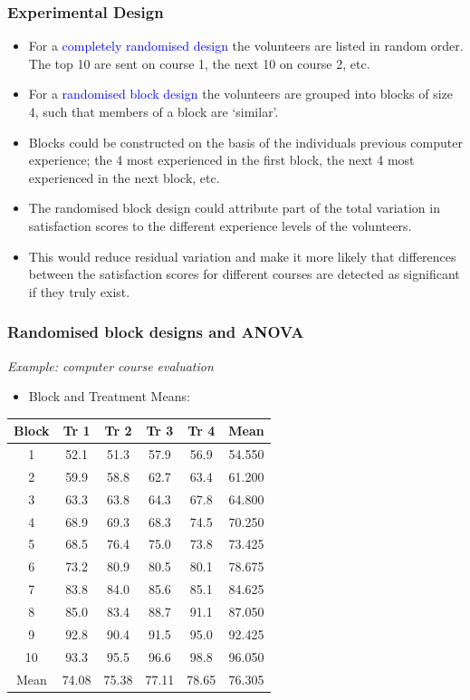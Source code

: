\documentclass[12pt,xcolor=dvipsnames,handout,mathserif,aspectratio=169]{beamer}
\newcommand{\tc}{\textcolor}
\begin{document}
\begin{frame}
\frametitle{Experimental Design}
\begin{itemize}
\item For a \tc{blue}{completely randomised design} the volunteers are listed in random order. The top
10 are sent on course 1, the next 10 on course 2, etc.
\vspace*{0.3cm}
\item For a \tc{blue}{randomised block design} the volunteers are grouped into blocks of size 4, such that members of a block are `similar'. 
\vspace{0.3cm}
\item Blocks could be constructed on the basis of the individuals previous computer experience;
the 4 most experienced in the first block, the next 4 most experienced in the next block, etc.
\vspace*{0.2cm}
\item The randomised block design could attribute part of the total variation in satisfaction
scores to the different experience levels of the volunteers. 
\vspace{0.2cm}
\item This would reduce residual variation and make it more likely that differences between the satisfaction scores for different courses
are detected as significant if they truly exist.
\end{itemize}
\end{frame}




\begin{frame}
\frametitle{Randomised block designs and ANOVA}
\emph{Example: computer course evaluation}\\
\vspace*{0.3cm}
\begin{itemize}
\item Block and Treatment Means:
\end{itemize}
\begin{center}
\vspace*{0.3cm}
{\small{
\begin{tabular}{c|cccc|c}\hline
Block& Tr 1& Tr 2& Tr 3& Tr 4& Mean\\ \hline
1& 52.1& 51.3& 57.9& 56.9& 54.550\\
2& 59.9& 58.8& 62.7& 63.4& 61.200\\
3& 63.3& 63.8& 64.3& 67.8& 64.800\\
4& 68.9& 69.3& 68.3& 74.5& 70.250\\
5& 68.5& 76.4& 75.0& 73.8& 73.425\\
6& 73.2& 80.9& 80.5& 80.1& 78.675\\
7& 83.8& 84.0& 85.6& 85.1& 84.625\\
8& 85.0& 83.4& 88.7& 91.1& 87.050\\
9& 92.8& 90.4& 91.5& 95.0& 92.425\\
10& 93.3& 95.5& 96.6& 98.8& 96.050\\ \hline
Mean &74.08& 75.38& 77.11& 78.65& 76.305\\ \hline
\end{tabular}}}
\end{center}
\end{frame}
\end{document}
